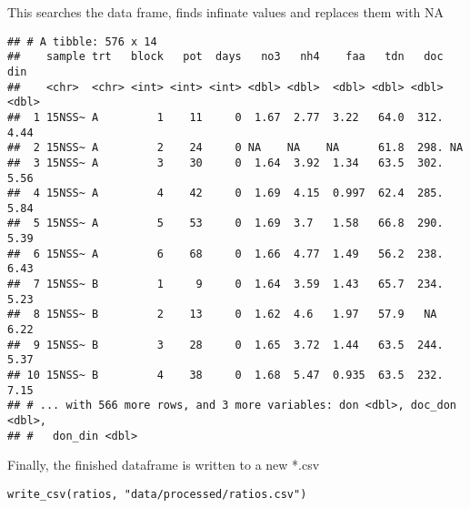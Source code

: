 \documentclass[]{article}
\begin{document}
This searches the data frame, finds infinate values and replaces them
with NA

\begin{verbatim}
## # A tibble: 576 x 14
##    sample trt   block   pot  days   no3   nh4    faa   tdn   doc   din
##    <chr>  <chr> <int> <int> <int> <dbl> <dbl>  <dbl> <dbl> <dbl> <dbl>
##  1 15NSS~ A         1    11     0  1.67  2.77  3.22   64.0  312.  4.44
##  2 15NSS~ A         2    24     0 NA    NA    NA      61.8  298. NA   
##  3 15NSS~ A         3    30     0  1.64  3.92  1.34   63.5  302.  5.56
##  4 15NSS~ A         4    42     0  1.69  4.15  0.997  62.4  285.  5.84
##  5 15NSS~ A         5    53     0  1.69  3.7   1.58   66.8  290.  5.39
##  6 15NSS~ A         6    68     0  1.66  4.77  1.49   56.2  238.  6.43
##  7 15NSS~ B         1     9     0  1.64  3.59  1.43   65.7  234.  5.23
##  8 15NSS~ B         2    13     0  1.62  4.6   1.97   57.9   NA   6.22
##  9 15NSS~ B         3    28     0  1.65  3.72  1.44   63.5  244.  5.37
## 10 15NSS~ B         4    38     0  1.68  5.47  0.935  63.5  232.  7.15
## # ... with 566 more rows, and 3 more variables: don <dbl>, doc_don <dbl>,
## #   don_din <dbl>
\end{verbatim}

Finally, the finished dataframe is written to a new *.csv

\texttt{write\_csv(ratios,\ "data/processed/ratios.csv")}
\end{document}
